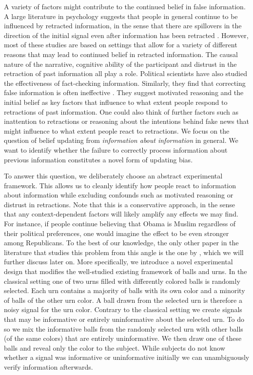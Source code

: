 \documentclass{article}
\begin{document}
A variety of factors might contribute to the continued belief in false information. A large literature in psychology suggests that people in general continue to be influenced by retracted information, in the sense that there are spillovers in the direction of the initial signal even after information has been retracted \citep[][and references therein]{Ecker2022}. However, most of these studies are based on settings that allow for a variety of different reasons that may lead to continued belief in retracted information. The causal nature of the narrative, cognitive ability of the participant and distrust in the retraction of past information all play a role. Political scientists have also studied the effectiveness of fact-checking information. Similarly, they find that correcting false information is often ineffective \citep{Nieminen2018}. They suggest motivated reasoning and the initial belief as key factors that influence to what extent people respond to retractions of past information. One could also think of further factors such as inattention to retractions or reasoning about the intentions behind fake news that might influence to what extent people react to retractions. We focus on the question of belief updating from \textit{information about information} in general. We want to identify whether the failure to correctly process information about previous information constitutes a novel form of updating bias. 

To answer this question, we deliberately choose an abstract experimental framework. This allows us to cleanly identify how people react to information about information while excluding confounds such as motivated reasoning or distrust in retractions. Note that this is a conservative approach, in the sense that any context-dependent factors will likely amplify any effects we may find. For instance, if people continue believing that Obama is Muslim regardless of their political preferences, one would imagine the effect to be even stronger among Republicans. To the best of our knowledge, the only other paper in the literature that studies this problem from this angle is the one by \cite{Goncalves2022}, which we will further discuss later on. 
More specifically, we introduce a novel experimental design that modifies the well-studied existing framework of balls and urns. In the classical setting one of two urns filled with differently colored balls is randomly selected. Each urn contains a majority of balls with its own color and a minority of balls of the other urn color. A ball drawn from the selected urn is therefore a noisy signal for the urn color. Contrary to the classical setting we create signals that may be informative or entirely uninformative about the selected urn. To do so we mix the informative balls from the randomly selected urn with other balls (of the same colors) that are entirely uninformative. We then draw one of these balls and reveal only the color to the subject. While subjects do not know whether a signal was informative or uninformative initially we can unambiguously verify information afterwards. 
\end{document}
